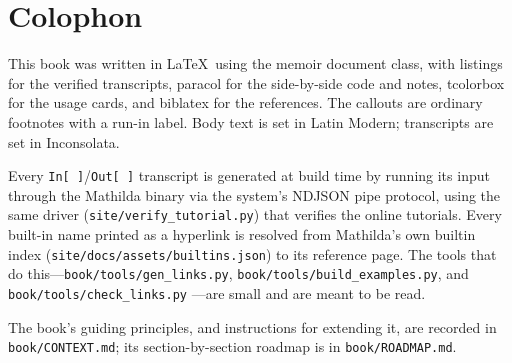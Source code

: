 \chapter{Colophon}

This book was written in \LaTeX\ using the \textsf{memoir} document class, with
\textsf{listings} for the verified transcripts, \textsf{paracol} for the
side-by-side code and notes, \textsf{tcolorbox} for the usage cards, and
\textsf{biblatex} for the references. The callouts are ordinary footnotes with a
run-in label. Body text is set in
Latin Modern; transcripts are set in Inconsolata.

Every \texttt{In[\,]}/\texttt{Out[\,]} transcript is generated at build time by
running its input through the Mathilda binary via the system's NDJSON pipe
protocol, using the same driver (\texttt{site/verify\_tutorial.py}) that verifies
the online tutorials. Every built-in name printed as a hyperlink is resolved
from Mathilda's own builtin index (\texttt{site/docs/assets/builtins.json}) to
its reference page. The tools that do this---\texttt{book/tools/gen\_links.py},
\texttt{book/tools/build\_examples.py}, and \texttt{book/tools/check\_links.py}
---are small and are meant to be read.

The book's guiding principles, and instructions for extending it, are recorded in
\texttt{book/CONTEXT.md}; its section-by-section roadmap is in
\texttt{book/ROADMAP.md}.
